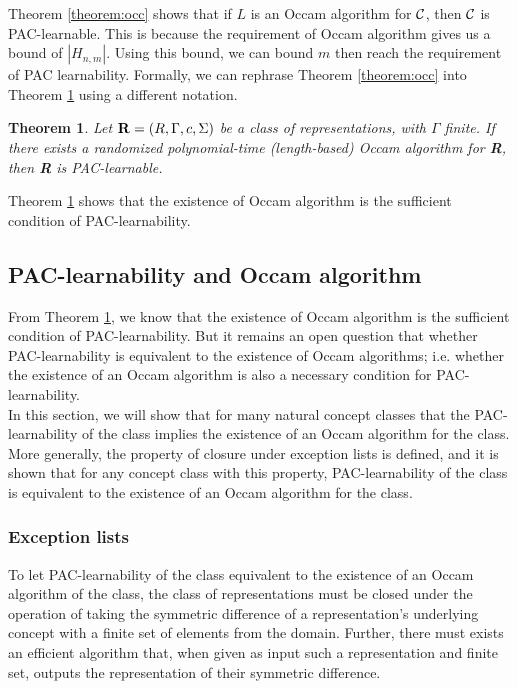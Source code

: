 \documentclass[12pt]{article}
\newtheorem{theorem}{Theorem}
\newcommand{\calc}{{\cal C}}
\begin{document}
Theorem \ref{theorem:occ} shows that if $L$ is an Occam algorithm for $\calc$, then $\calc$ is PAC-learnable. This is because the requirement of Occam algorithm gives us a bound of $|H_{n,m}|$. Using this bound, we can bound $m$ then reach the requirement of PAC learnability. Formally, we can rephrase Theorem \ref{theorem:occ} into Theorem \ref{theorem:suf} using a different notation.

\begin{theorem} \label{theorem:suf}
Let ${\bf R} = (R, \Gamma, c, \Sigma)$ be a class of representations, with $\Gamma$ finite. If there exists a randomized polynomial-time (length-based) Occam algorithm for {\bf R}, then {\bf R} is PAC-learnable.
\end{theorem}

Theorem \ref{theorem:suf} shows that the existence of Occam algorithm is the sufficient condition of PAC-learnability.

\subsection{PAC-learnability and Occam algorithm}

From Theorem \ref{theorem:suf}, we know that the existence of Occam algorithm is the sufficient condition of PAC-learnability. But it remains an open question that whether PAC-learnability is equivalent to the existence of Occam algorithms; i.e. whether the existence of an Occam algorithm is also a necessary condition for PAC-learnability. \\

In this section, we will show that for many natural concept classes that the PAC-learnability of the class implies the existence of an Occam algorithm for the class. More generally, the property of closure under exception lists is defined, and it is shown that for any concept class with this property, PAC-learnability of the class is equivalent to the existence of an Occam algorithm for the class.

\subsubsection{Exception lists}

To let PAC-learnability of the class equivalent to the existence of an Occam algorithm of the class, the class of representations must be closed under the operation of taking the symmetric difference of a representation's underlying concept with a finite set of elements from the domain. Further, there must exists an efficient algorithm that, when given as input such a representation and finite set, outputs the representation of their symmetric difference.
\end{document}
